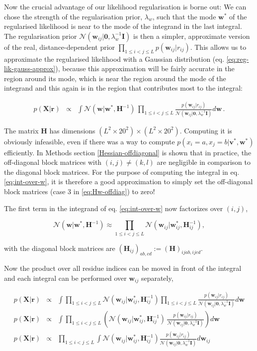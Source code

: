 \documentclass[12pt,a4paper,twoside]{book}
\newcommand{\eq}{\!=\!}
\newcommand{\Gauss}{\mathcal{N}}
\renewcommand{\H}{\mathbf{H}}
\newcommand{\I}{\mathbf{I}}
\renewcommand{\r}{\mathbf{r}}
\newcommand{\rij}{r_{ij}}
\renewcommand{\v}{\mathbf{v}}
\newcommand{\w}{\mathbf{w}}
\newcommand{\wij}{\mathbf{w}_{ij}}
\newcommand{\X}{\mathbf{X}}
\theoremstyle{definition}
\theoremstyle{definition}
\theoremstyle{remark}
\begin{document}
Now the crucial advantage of our likelihood regularisation is borne out:
We can chose the strength of the regularisation prior, \(\lambda_w\),
such that the mode \(\w^*\) of the regularised likelihood is near to the
mode of the integrand in the last integral. The regularisation prior
\(\Gauss(\wij|\mathbf{0}, \lambda_w^{-1} \I)\) is then a simpler,
approximate version of the real, distance-dependent prior
\(\prod_{1\le i<j\le L} p(\wij|\rij)\). This allows us to approximate
the regularised likelihood with a Gaussian distribution (eq.
\eqref{eq:reg-lik-gauss-approx}), because this approximation will be
fairly accurate in the region around its mode, which is near the region
around the mode of the integrand and this again is in the region that
contributes most to the integral:

\begin{eqnarray}
      p(\X | \r) &\propto& \int \Gauss (\w | \w^*, \H^{-1} ) \, \prod_{1 \le i<j \le L} \frac{p(\wij | \rij)}{\Gauss(\wij|\mathbf{0}, \lambda_w^{-1} \I)} d\w \,.
\label{eq:int-over-w}
\end{eqnarray}

The matrix \(\H\) has dimensions
\((L^2 \times 20^2) \times (L^2 \times 20^2)\). Computing it is
obviously infeasible, even if there was a way to compute
\(p(x_i \eq a, x_j \eq b| \v^*,\w^*)\) efficiently. In Methods section
\ref{Hessian-offdiagonal} is shown that in practice, the off-diagonal
block matrices with \((i,j) \ne (k,l)\) are negligible in comparison to
the diagonal block matrices. For the purpose of computing the integral
in eq. \eqref{eq:int-over-w}, it is therefore a good approximation to
simply set the off-diagonal block matrices (case 3 in
\eqref{eq:Hw-offdiag}) to zero!

The first term in the integrand of eq. \eqref{eq:int-over-w} now
factorizes over \((i,j)\),

\begin{equation}
  \Gauss (\w | \w^{*}, \H^{-1}) \approx \prod_{1 \le i < j \le L} \Gauss (\wij | \wij^{*}, \H_{ij}^{-1}) ,
\end{equation}

with the diagonal block matrices are
\((\H_{ij})_{ab,cd} := (\H)_{ijab,ijcd}\).

Now the product over all residue indices can be moved in front of the
integral and each integral can be performed over \(\wij\) separately,

\begin{eqnarray}
  p(\X | \r) &\propto& \int \prod_{1 \le i < j \le L} \Gauss (\wij | \wij^{*}, \H_{ij}^{-1}) \prod_{1 \le i<j \le L} \frac{p(\wij | \rij)}{\Gauss(\wij|\mathbf{0}, \lambda_w^{-1} \I)} d\w  \\
  p(\X | \r) &\propto& \int \prod_{1\le i<j\le L} \left(  \Gauss (\wij | \wij^*, \H_{ij}^{-1}) \, \frac{p(\wij | \rij)}{\Gauss(\wij | \mathbf{0}, \lambda_w^{-1} \I)} \right) d\w \\
  p(\X | \r) &\propto& \prod_{1\le i<j\le L}  \int \Gauss (\wij | \wij^*, \H_{ij}^{-1}) \frac{p(\wij | \rij)}{\Gauss (\wij | \mathbf{0}, \lambda_w^{-1} \I)} d \wij 
\label{eq:int-over-w-2}
\end{eqnarray}
\end{document}

